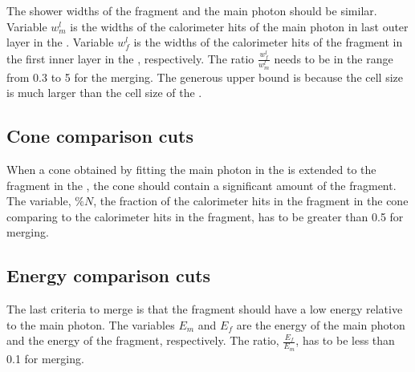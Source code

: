 The shower widths of the fragment and the main photon should be similar. Variable $w^l_m$ is the \rms widths of the calorimeter hits of the main photon in last outer layer  in the \ECAL. Variable  $w^l_f$ is the  \rms widths of the calorimeter hits of the fragment in the first inner layer  in the \HCAL, respectively. The ratio $\frac{w^l_f}{w^l_m}$ needs to be in the range from 0.3 to 5 for the merging. The generous upper bound is because the \HCAL cell size is much larger than the cell size of the \ECAL.

\subsection{Cone comparison cuts}

When a cone obtained by fitting the main photon in the \ECAL is extended to the fragment in the \HCAL, the cone should contain a significant amount of the fragment. The variable, $\%{N}$, the fraction of the calorimeter hits in the fragment in the cone comparing to the  calorimeter hits in the fragment, has to be greater than 0.5 for merging.

\subsection{Energy comparison cuts}


The last criteria to merge is that the fragment should have a low energy relative to the main photon. The variables $E_m$ and $E_f$ are the energy of the main photon  and the energy of the fragment, respectively. The ratio, $\frac{E_f}{E_m}$, has to be less than 0.1 for merging.




